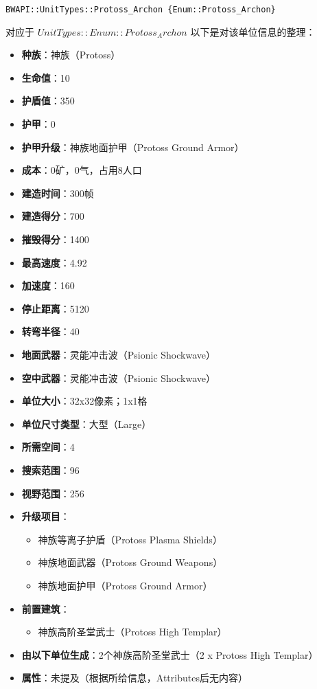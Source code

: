 \begin{tcolorbox}[colback=white, colframe=black!60!white, title=Protoss\_Archon(), arc=0mm]
    \begin{verbatim}
BWAPI::UnitTypes::Protoss_Archon {Enum::Protoss_Archon}
    \end{verbatim}
    对应于  $ UnitTypes::Enum::Protoss_Archon $ 
    以下是对该单位信息的整理：
\begin{itemize}
    \item \textbf{种族}：神族（Protoss）
    \item \textbf{生命值}：10
    \item \textbf{护盾值}：350
    \item \textbf{护甲}：0
    \item \textbf{护甲升级}：神族地面护甲（Protoss Ground Armor）
    \item \textbf{成本}：0矿，0气，占用8人口
    \item \textbf{建造时间}：300帧
    \item \textbf{建造得分}：700
    \item \textbf{摧毁得分}：1400
    \item \textbf{最高速度}：4.92
    \item \textbf{加速度}：160
    \item \textbf{停止距离}：5120
    \item \textbf{转弯半径}：40
    \item \textbf{地面武器}：灵能冲击波（Psionic Shockwave）
    \item \textbf{空中武器}：灵能冲击波（Psionic Shockwave）
    \item \textbf{单位大小}：32x32像素；1x1格
    \item \textbf{单位尺寸类型}：大型（Large）
    \item \textbf{所需空间}：4
    \item \textbf{搜索范围}：96
    \item \textbf{视野范围}：256
    \item \textbf{升级项目}：
        \begin{itemize}
            \item 神族等离子护盾（Protoss Plasma Shields）
            \item 神族地面武器（Protoss Ground Weapons）
            \item 神族地面护甲（Protoss Ground Armor）
        \end{itemize}
    \item \textbf{前置建筑}：
        \begin{itemize}
            \item 神族高阶圣堂武士（Protoss High Templar）
        \end{itemize}
    \item \textbf{由以下单位生成}：2个神族高阶圣堂武士（2 x Protoss High Templar）
    \item \textbf{属性}：未提及（根据所给信息，Attributes后无内容）
\end{itemize} 
\end{tcolorbox}


